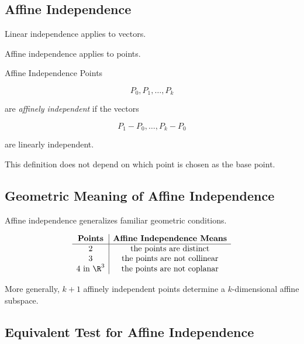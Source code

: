 \subsection{Affine Independence}
\label{subsec:affine-independence}

Linear independence applies to vectors.

Affine independence applies to points.

\begin{definitionbox}{Affine Independence}
Points

\[ P_0,P_1,\ldots,P_k \]

are \emph{affinely independent} if the vectors

\[
\boxed{
P_1-P_0,\ldots,P_k-P_0
}
\]

are linearly independent.
\end{definitionbox}

This definition does not depend on which point is chosen as the base point.

\subsection{Geometric Meaning of Affine Independence}
\label{subsec:geometric-affine-independence}

Affine independence generalizes familiar geometric conditions.

\[
\begin{array}{c|c}
\textbf{Points} & \textbf{Affine Independence Means}\\
\hline
2 & \text{the points are distinct}\\
3 & \text{the points are not collinear}\\
4\text{ in }\R^3 & \text{the points are not coplanar}
\end{array}
\]

More generally, \(k+1\) affinely independent points determine a
\(k\)-dimensional affine subspace.

\subsection{Equivalent Test for Affine Independence}
\label{subsec:affine-independence-equivalent}


